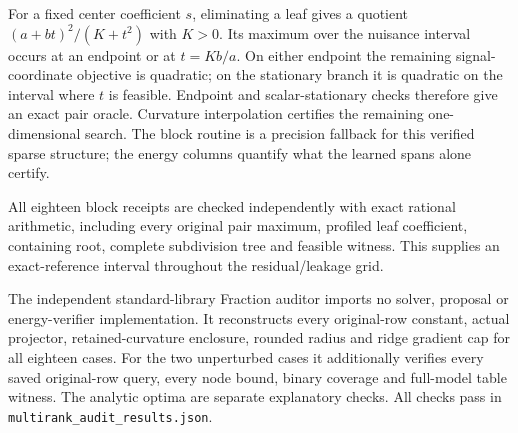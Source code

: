 For a fixed center coefficient $s$, eliminating a leaf gives a quotient $(a+bt)^2/(K+t^2)$ with $K>0$. Its maximum over the nuisance interval occurs at an endpoint or at $t=Kb/a$. On either endpoint the remaining signal-coordinate objective is quadratic; on the stationary branch it is quadratic on the interval where $t$ is feasible. Endpoint and scalar-stationary checks therefore give an exact pair oracle. Curvature interpolation certifies the remaining one-dimensional search. The block routine is a precision fallback for this verified sparse structure; the energy columns quantify what the learned spans alone certify.

All eighteen block receipts are checked independently with exact rational arithmetic, including every original pair maximum, profiled leaf coefficient, containing root, complete subdivision tree and feasible witness. This supplies an exact-reference interval throughout the residual/leakage grid.

The independent standard-library Fraction auditor imports no solver, proposal or energy-verifier implementation. It reconstructs every original-row constant, actual projector, retained-curvature enclosure, rounded radius and ridge gradient cap for all eighteen cases. For the two unperturbed cases it additionally verifies every saved original-row query, every node bound, binary coverage and full-model table witness. The analytic optima are separate explanatory checks. All checks pass in \texttt{multirank\_audit\_results.json}.
